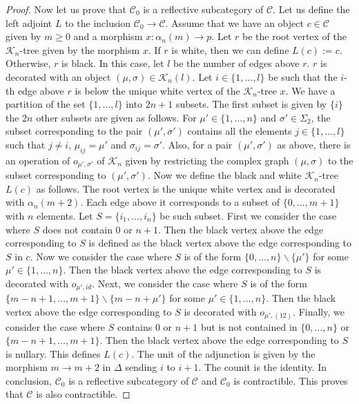 \documentclass[]{amsart}
\theoremstyle{definition}
\begin{document}
\begin{proof}
	Now let us prove that $\mathcal{C}_0$ is a reflective subcategory of $\mathcal{C}$. Let us define the left adjoint $L$ to the inclusion $\mathcal{C}_0 \to \mathcal{C}$. Assume that we have an object $c \in \mathcal{C}$ given by $m \geq 0$ and a morphism $x: \alpha_n(m) \to p$. Let $r$ be the root vertex of the $\mathcal{K}_n$-tree given by the morphism $x$. If $r$ is white, then we can define $L(c) := c$. Otherwise, $r$ is black. In this case, let $l$ be the number of edges above $r$. $r$ is decorated with an object $(\mu,\sigma) \in \mathcal{K}_n(l)$. Let $i \in \{1,\ldots,l\}$ be such that the $i$-th edge above $r$ is below the unique white vertex of the $\mathcal{K}_n$-tree $x$. We have a partition of the set $\{1,\ldots,l\}$ into $2n+1$ subsets. The first subset is given by $\{i\}$ the $2n$ other subsets are given as follows. For $\mu' \in \{1,\ldots,n\}$ and $\sigma' \in \Sigma_2$, the subset corresponding to the pair $(\mu',\sigma')$ contains all the elements $j \in \{1,\ldots,l\}$ such that $j \neq i$, $\mu_{ij}=\mu'$ and $\sigma_{ij}=\sigma'$. Also, for a pair $(\mu',\sigma')$ as above, there is an operation of $o_{\mu',\sigma'}$ of $\mathcal{K}_n$ given by restricting the complex graph $(\mu,\sigma)$ to the subset corresponding to $(\mu',\sigma')$. Now we define the black and white $\mathcal{K}_n$-tree $L(c)$ as follows. The root vertex is the unique white vertex and is decorated with $\alpha_n(m+2)$. Each edge above it corresponds to a subset of $\{0,\ldots,m+1\}$ with $n$ elements. Let $S=\{i_1,\ldots,i_n\}$ be such subset. First we consider the case where $S$ does not contain $0$ or $n+1$. Then the black vertex above the edge corresponding to $S$ is defined as the black vertex above the edge corresponding to $S$ in $c$. Now we consider the case where $S$ is of the form $\{0,\ldots,n\} \backslash \{\mu'\}$ for some $\mu' \in \{1,\ldots,n\}$. Then the black vertex above the edge corresponding to $S$ is decorated with $o_{\mu',id}$. Next, we consider the case where $S$ is of the form $\{m-n+1,\ldots,m+1\} \backslash \{m-n+\mu'\}$ for some $\mu' \in \{1,\ldots,n\}$. Then the black vertex above the edge corresponding to $S$ is decorated with $o_{\mu',(12)}$. Finally, we consider the case where $S$ contains $0$ or $n+1$ but is not contained in $\{0,\ldots,n\}$ or $\{m-n+1,\ldots,m+1\}$. Then the black vertex above the edge corresponding to $S$ is nullary. This defines $L(c)$. The unit of the adjunction is given by the morphism $m \to m+2$ in $\Delta$ sending $i$ to $i+1$. The counit is the identity. In conclusion, $\mathcal{C}_0$ is a reflective subcategory of $\mathcal{C}$ and $\mathcal{C}_0$ is contractible. This proves that $\mathcal{C}$ is also contractible.
\end{proof}
\end{document}
